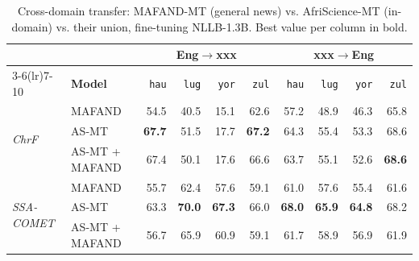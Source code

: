 \begin{table}[t]
\centering
\footnotesize
\setlength{\tabcolsep}{4pt}
\renewcommand{\arraystretch}{1.05}
\caption{Cross-domain transfer: MAFAND-MT (general news) vs. AfriScience-MT (in-domain) vs. their union, fine-tuning NLLB-1.3B. Best value per column in bold.}
\label{tab:mafand_compare}
\begin{tabular}{llrrrrrrrr}
\toprule
 & & \multicolumn{4}{c}{\textbf{Eng$\to$xxx}} & \multicolumn{4}{c}{\textbf{xxx$\to$Eng}} \\
\cmidrule(lr){3-6}\cmidrule(lr){7-10}
 & \textbf{Model} & \texttt{hau} & \texttt{lug} & \texttt{yor} & \texttt{zul} & \texttt{hau} & \texttt{lug} & \texttt{yor} & \texttt{zul} \\
\midrule
\multirow{3}{*}{\textit{ChrF}} & MAFAND & 54.5 & 40.5 & 15.1 & 62.6 & 57.2 & 48.9 & 46.3 & 65.8 \\
 & AS-MT & \textbf{67.7} & 51.5 & 17.7 & \textbf{67.2} & 64.3 & 55.4 & 53.3 & 68.6 \\
 & AS-MT + MAFAND & 67.4 & 50.1 & 17.6 & 66.6 & 63.7 & 55.1 & 52.6 & \textbf{68.6} \\
\midrule
\multirow{3}{*}{\textit{SSA-COMET}} & MAFAND & 55.7 & 62.4 & 57.6 & 59.1 & 61.0 & 57.6 & 55.4 & 61.6 \\
 & AS-MT & 63.3 & \textbf{70.0} & \textbf{67.3} & 66.0 & \textbf{68.0} & \textbf{65.9} & \textbf{64.8} & 68.2 \\
 & AS-MT + MAFAND & 56.7 & 65.9 & 60.9 & 59.1 & 61.7 & 58.9 & 56.9 & 61.9 \\
\bottomrule
\end{tabular}
\end{table}